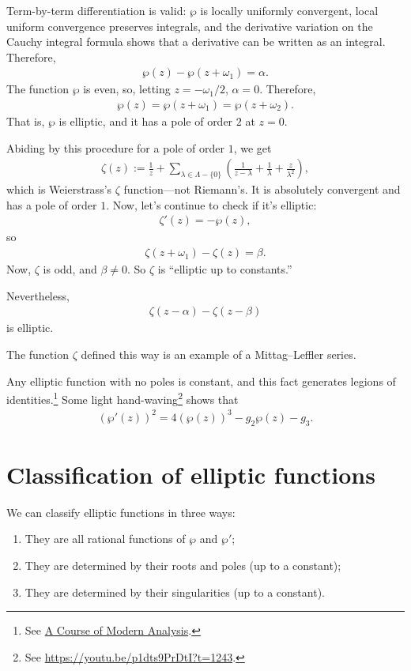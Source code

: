 \documentclass[11pt, oneside,margin=1in]{article}
\begin{document}
Term-by-term differentiation is valid: $\wp$ is locally uniformly convergent, local uniform convergence preserves integrals, and the derivative variation on the Cauchy integral formula shows that a derivative can be written as an integral. Therefore, 
\begin{align*}
	\wp(z) - \wp (z+\omega_1) = \alpha.
\end{align*}
The function $\wp$ is even, so, letting $z=-\omega_1/2$, $\alpha = 0$. Therefore,
\begin{align*}
	\wp(z) = \wp (z+\omega_1) = \wp(z+\omega_2).
\end{align*}
That is, $\wp$ is elliptic, and it has a pole of order $2$ at $z=0$. 

Abiding by this procedure for a pole of order $1$, we get
\begin{align*}
	\zeta(z) :=  \frac{1}{z} + \sum_{\lambda\in \Lambda-\{0\}}^{} \left( \frac{1}{z-\lambda}+ \frac{1}{\lambda} + \frac{z}{\lambda^2} \right), 
\end{align*}
which is Weierstrass's $\zeta$ function---not Riemann's. It is absolutely convergent and has a pole of order $1$. Now, let's continue to check if it's elliptic:
\begin{align*}
	\zeta'(z) = -\wp (z),
\end{align*}
so 
\begin{align*}
	\zeta(z+\omega_1) - \zeta(z) = \beta.
\end{align*}
Now, $\zeta$ is odd, and $\beta\ne 0$. So $\zeta$ is ``elliptic up to constants.''

Nevertheless, 
\begin{align*}
	\zeta(z-\alpha) - \zeta (z-\beta)
\end{align*} 
is elliptic. 

The function $\zeta$ defined this way is an example of a Mittag--Leffler series.

Any elliptic function with no poles is constant, and this fact generates legions of identities.\footnote{See \underline{A Course of Modern Analysis}.} Some light hand-waving\footnote{See \url{https://youtu.be/p1dts9PrDtI?t=1243}.} shows that
\begin{align*}
	(\wp'(z)) ^2 = 4(\wp(z)) ^3 - g_2\wp(z) -  g_3.
\end{align*}

\section{Classification of elliptic functions}
We can classify elliptic functions in three ways:
\begin{enumerate}
	\item They are all rational functions of $\wp$ and $\wp'$;
	\item They are determined by their roots and poles (up to a constant); 
	\item They are determined by their singularities (up to a constant).
\end{enumerate}
\end{document}

